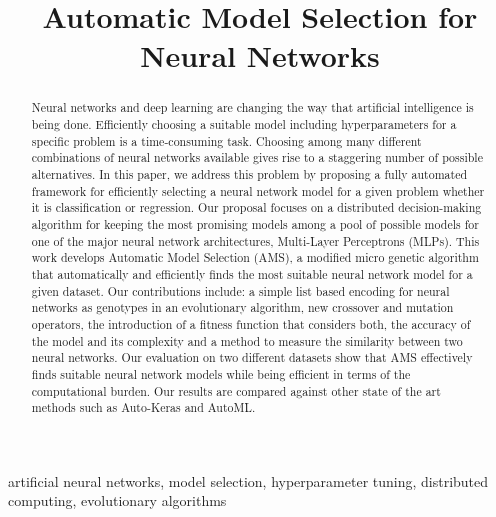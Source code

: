 
\begin{frontmatter}

\title{Automatic Model Selection for Neural Networks}

\begin{comment}
\author{David Laredo$^{1}$, Yulin Qin$^{1}$, Oliver Sch\"utze$^{2}$ and Jian-Qiao Sun$^{1}$}
\address{
$^{1}$Department of Mechanical Engineering, School of Engineering\\
University of California, Merced, CA 95343, USA\\
$^{2}$Department of Computer Science, CINVESTAV, Mexico City, Mexico\\
and Rodolfo Quintero Chair, UAM Cuajimalpa, Mexico\\
Corresponding author: Jian-Qiao Sun. Email: jqsun@ucmerced.edu}
\end{comment}

\begin{abstract}
Neural networks and deep learning are changing the way that artificial intelligence is being done. Efficiently choosing a suitable model including hyperparameters for a specific problem is a time-consuming task. Choosing among many different combinations of neural networks available gives rise to a staggering number of possible alternatives. In this paper, we address this problem by proposing a fully automated framework for efficiently selecting a neural network model for a given problem whether it is classification or regression. Our proposal focuses on a distributed decision-making algorithm for keeping the most promising models among a pool of possible models for one of the major neural network architectures, Multi-Layer Perceptrons (MLPs). This work develops Automatic Model Selection (AMS), a modified micro genetic algorithm that automatically and efficiently finds the most suitable neural network model for a given dataset. Our contributions include: a simple list based encoding for neural networks as genotypes in an evolutionary algorithm, new crossover and mutation operators, the introduction of a fitness function that considers both, the accuracy of the model and its complexity and a method to measure the similarity between two neural networks. Our evaluation on two different datasets show that AMS effectively finds suitable neural network models while being efficient in terms of the computational burden. Our results are compared against other state of the art methods such as Auto-Keras and AutoML.
\end{abstract}


\begin{keyword}
artificial neural networks\sep
model selection\sep
hyperparameter tuning\sep
distributed computing\sep
evolutionary algorithms
\end{keyword}

\end{frontmatter}

